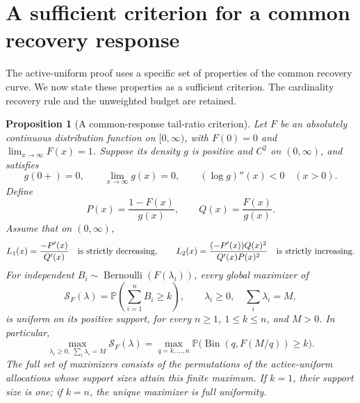 \documentclass[11pt]{article}
\newtheorem{proposition}[theorem]{Proposition}
\theoremstyle{definition}
\theoremstyle{remark}
\DeclareMathOperator{\Bernoulli}{Bernoulli}
\DeclareMathOperator{\Bin}{Bin}
\newcommand{\Pbb}{\mathbb P}
\newcommand{\1}{\mathbf 1}
\begin{document}
\section{A sufficient criterion for a common recovery response}
\label{subsec:common-recovery-criterion}

The active-uniform proof uses a specific set of properties of the common
recovery curve. We now state these properties as a sufficient criterion.
The cardinality recovery rule and the unweighted budget are retained.

\begin{proposition}[A common-response tail-ratio criterion]
\label{prop:common-recovery-active-uniform}
Let \(F\) be an absolutely continuous distribution function on
\([0,\infty)\), with \(F(0)=0\) and \(\lim_{x\to\infty}F(x)=1\).
Suppose its density \(g\) is positive and \(C^2\) on
\((0,\infty)\), and satisfies
\begin{equation}\label{eq:common-response-density-hypotheses}
  g(0+)=0,\qquad \lim_{x\to\infty}g(x)=0,
  \qquad (\log g)''(x)<0\quad(x>0).
\end{equation}
Define
\[
  P(x)=\frac{1-F(x)}{g(x)},\qquad
  Q(x)=\frac{F(x)}{g(x)}.
\]
Assume that on \((0,\infty)\),
\begin{equation}\label{eq:common-response-slope-hypotheses}
  L_1(x)=\frac{-P'(x)}{Q'(x)}
       \quad\hbox{is strictly decreasing},\qquad
  L_2(x)=\frac{(-P'(x))Q(x)^2}{Q'(x)P(x)^2}
       \quad\hbox{is strictly increasing}.
\end{equation}
For independent \(B_i\sim\Bernoulli(F(\lambda_i))\), every global
maximizer of
\[
  \mathcal S_F(\lambda)
  =\Pbb\left(\sum_{i=1}^n B_i\ge k\right),
  \qquad \lambda_i\ge0,\quad\sum_i\lambda_i=M,
\]
is uniform on its positive support, for every \(n\ge1\),
\(1\le k\le n\), and \(M>0\).  In particular,
\begin{equation}\label{eq:common-response-active-uniform-value}
  \max_{\lambda_i\ge0,\ \sum_i\lambda_i=M}\mathcal S_F(\lambda)
  =\max_{q=k,\ldots,n}
      \Pbb\bigl(\Bin(q,F(M/q))\ge k\bigr).
\end{equation}
The full set of maximizers consists of the permutations of the
active-uniform allocations whose support sizes attain this finite
maximum.  If \(k=1\), their support size is one; if \(k=n\), the
unique maximizer is full uniformity.
\end{proposition}
\end{document}
